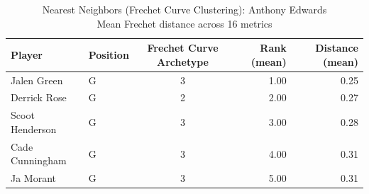 \begin{table}[t]
\caption*{
{\fontsize{20}{25} Nearest Neighbors (Frechet Curve Clustering): Anthony Edwards\fontsize{12}{15}\selectfont } \\ 
{\fontsize{14}{17}\selectfont  Mean Frechet distance across 16 metrics\fontsize{12}{15}\selectfont }
} 
\fontsize{12.0pt}{14.0pt}\selectfont
\begin{tabular*}{\linewidth}{@{\extracolsep{\fill}}llcrr}
\toprule
Player & Position & Frechet Curve Archetype & Rank (mean) & Distance (mean) \\ 
\midrule\addlinespace[2.5pt]
Jalen Green & G & 3 & 1.00 & 0.25 \\ 
Derrick Rose & G & 2 & 2.00 & 0.27 \\ 
Scoot Henderson & G & 3 & 3.00 & 0.28 \\ 
Cade Cunningham & G & 3 & 4.00 & 0.31 \\ 
Ja Morant & G & 3 & 5.00 & 0.31 \\ 
\bottomrule
\end{tabular*}
\end{table}

